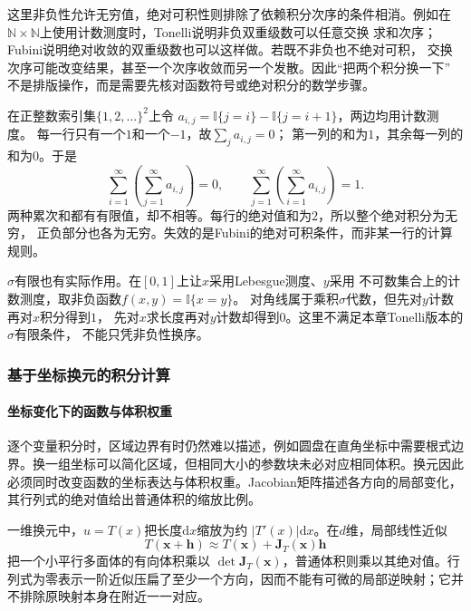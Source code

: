 这里非负性允许无穷值，绝对可积性则排除了依赖积分次序的条件相消。例如在
$\mathbb{N}\times\mathbb{N}$上使用计数测度时，Tonelli说明非负双重级数可以任意交换
求和次序；Fubini说明绝对收敛的双重级数也可以这样做。若既不非负也不绝对可积，
交换次序可能改变结果，甚至一个次序收敛而另一个发散。因此“把两个积分换一下”
不是排版操作，而是需要先核对函数符号或绝对积分的数学步骤。

\begin{example}[行列各自可加仍不足以换序]
\label{ex:analysis-iterated-sum-failure}
在正整数索引集$\{1,2,\ldots\}^2$上令
$a_{i,j}=\mathbb I\{j=i\}-\mathbb I\{j=i+1\}$，两边均用计数测度。
每一行只有一个$1$和一个$-1$，故$\sum_j a_{i,j}=0$；
第一列的和为$1$，其余每一列的和为$0$。于是
\[
 \sum_{i=1}^{\infty}\left(\sum_{j=1}^{\infty}a_{i,j}\right)=0,
 \qquad
 \sum_{j=1}^{\infty}\left(\sum_{i=1}^{\infty}a_{i,j}\right)=1.
\]
两种累次和都有有限值，却不相等。每行的绝对值和为$2$，所以整个绝对积分为无穷，
正负部分也各为无穷。失效的是Fubini的绝对可积条件，而非某一行的计算规则。
\end{example}

$\sigma$有限也有实际作用。在$[0,1]$上让$x$采用Lebesgue测度、$y$采用
不可数集合上的计数测度，取非负函数$f(x,y)=\mathbb I\{x=y\}$。
对角线属于乘积$\sigma$代数，但先对$y$计数再对$x$积分得到$1$，
先对$x$求长度再对$y$计数却得到$0$。这里不满足本章Tonelli版本的$\sigma$有限条件，
不能只凭非负性换序。

\subsubsection{基于坐标换元的积分计算}
\label{sec:analysis-coordinate-change-integral-applications}
\paragraph{坐标变化下的函数与体积权重}
逐个变量积分时，区域边界有时仍然难以描述，例如圆盘在直角坐标中需要根式边界。换一组坐标可以简化区域，但相同大小的参数块未必对应相同体积。换元因此必须同时改变函数的坐标表达与体积权重。Jacobian矩阵描述各方向的局部变化，其行列式的绝对值给出普通体积的缩放比例。

一维换元中，$u=T(x)$把长度$\mathrm{d}x$缩放为约 $|T'(x)|\mathrm{d}x$。在$d$维，局部线性近似
\[   T(\bm{x}+\bm{h})   \approx   T(\bm{x})+\bm{J}_T(\bm{x})\bm{h} \]
把一个小平行多面体的有向体积乘以 $\det\bm{J}_T(\bm{x})$，普通体积则乘以其绝对值。行列式为零表示一阶近似压扁了至少一个方向，因而不能有可微的局部逆映射；它并不排除原映射本身在附近一一对应。


